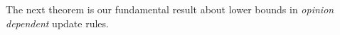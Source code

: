 



The next theorem is our fundamental result about lower bounds in
\emph{opinion dependent} update rules.

